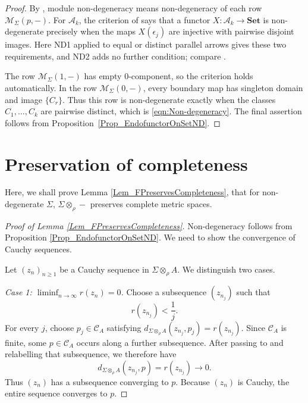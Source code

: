 \documentclass{sn-jnl}%
\theoremstyle{thmstyleone}%
\theoremstyle{thmstyletwo}%
\theoremstyle{thmstylethree}%
\newcommand{\M}{\Sigma}
\newcommand{\Fw}{\M\otimes_{\w}}
\newcommand{\dqm}[1]{d_{\M \otimes_{\w} #1}}
\newcommand{\w}{\rho}
\begin{document}
\begin{appendices}
\begin{proof}
By \cite[Definition~2.7]{Lein}, module non-degeneracy means non-degeneracy of each row $\mathcal M_\Sigma(p,-)$. For $\mathcal A_k$, the criterion of \cite[Theorem~4.11]{Lein} says that a functor $X:\mathcal A_k\to\mathbf{Set}$ is non-degenerate precisely when the maps $X(\epsilon_j)$ are injective with pairwise disjoint images. Here ND1 applied to equal or distinct parallel arrows gives these two requirements, and ND2 adds no further condition; compare \cite[Example~4.2]{Lein}.

The row $\mathcal M_\Sigma(1,-)$ has empty $0$-component, so the criterion holds automatically. In the row $\mathcal M_\Sigma(0,-)$, every boundary map has singleton domain and image $\{C_r\}$. Thus this row is non-degenerate exactly when the classes $C_1,\ldots,C_k$ are pairwise distinct, which is \eqref{eqn:Non-degeneracy}. The final assertion follows from Proposition~\ref{Prop_EndofunctorOnSetND}.
\end{proof}

\section{Preservation of completeness}
\label{App_FPreservesCompleteness}

Here, we shall prove Lemma \ref{Lem_FPreservesCompleteness}, that for non-degenerate $\Sigma$, $\Fw -$ preserves complete metric spaces. 

\begin{proof}[Proof of Lemma \ref{Lem_FPreservesCompleteness}]
Non-degeneracy follows from Proposition \ref{Prop_EndofunctorOnSetND}. We need to show the convergence of Cauchy sequences.

Let $(z_n)_{n\geq1}$ be a Cauchy sequence in ${\Fw A}$.  We distinguish two cases.

\smallskip
\noindent\emph{Case 1: $\liminf_{n\to\infty}r(z_n)=0$.}
Choose a subsequence $(z_{n_j})$ such that
\begin{equation} 
\nonumber
   r(z_{n_j})<\frac1j.
\end{equation}
For every $j$, choose $p_j\in \mathcal C_A$ satisfying $d_{\Fw A}(z_{n_j},p_j)=r(z_{n_j})$.  Since $\mathcal C_A$ is finite, some $p\in \mathcal C_A$ occurs along a further subsequence.  After passing to and relabelling that subsequence, we therefore have
\begin{equation} 
\nonumber
   \dqm{A}(z_{n_j},p)=r(z_{n_j})\longrightarrow0.
\end{equation}
Thus $(z_n)$ has a subsequence converging to $p$.  Because $(z_n)$ is Cauchy, the entire sequence converges to $p$.  


\end{proof}
\end{appendices}
\end{document}
